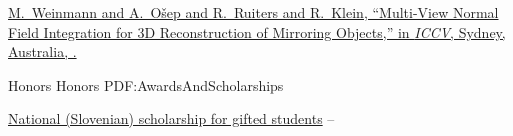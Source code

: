 \documentclass[letterpaper,MMMyyyy,nonstopmode]{simpleresumecv}
\begin{document}
\begin{Body}
%
%

\Gap
\href{https://www.vision.rwth-aachen.de/media/papers/weinmann_reconstruction_of_mirroring_objects_iccv2013.pdf}
{M.~Weinmann and \underline{A.~Ošep} and R.~Ruiters and R.~Klein,
``Multi-View Normal Field Integration for 3D Reconstruction of Mirroring Objects,''
in \textit{ICCV},
Sydney, Australia,
.}

\endgroup

\Section
{Honors}
{Honors}
{PDF:AwardsAndScholarships}

\Gap
\BulletItem
\href{http://www.sklad-kadri.si/en/scholarships/zois-scholarships/}{National (Slovenian) scholarship for gifted students}
\hfill
{} --
%
%
%
%
%


\end{Body}
\end{document}
